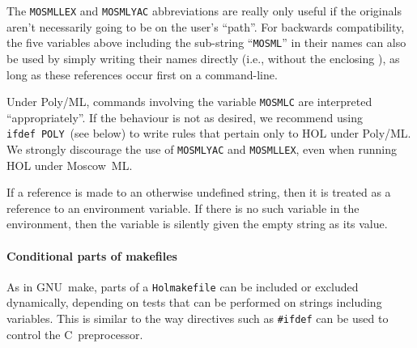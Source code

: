 The \texttt{MOSMLLEX} and \texttt{MOSMLYAC} abbreviations are really
only useful if the originals aren't necessarily going to be on the
user's ``path''.  For backwards compatibility, the five variables
above including the sub-string ``\texttt{MOSML}'' in their names can
also be used by simply writing their names directly (i.e., without the
enclosing \varref{\dots}), as long as these references occur first on
a command-line.

Under Poly/ML, commands involving the variable \texttt{MOSMLC} are interpreted ``appropriately''.
If the behaviour is not as desired, we recommend using \texttt{ifdef~POLY}~(see below) to write rules that pertain only to HOL under Poly/ML.
We strongly discourage the use of \texttt{MOSMLYAC} and \texttt{MOSMLLEX}, even when running HOL under Moscow~ML.

If a reference is made to an otherwise undefined string, then it is
treated as a reference to an environment variable.  If there is no
such variable in the environment, then the variable is silently given
the empty string as its value.

\paragraph{Conditional parts of makefiles}
As in GNU~\textsf{make}, parts of a \texttt{Holmakefile} can be included or excluded dynamically, depending on tests that can be performed on strings including variables.
%
This is similar to the way directives such as \texttt{\#ifdef} can be used to control the C~preprocessor.

